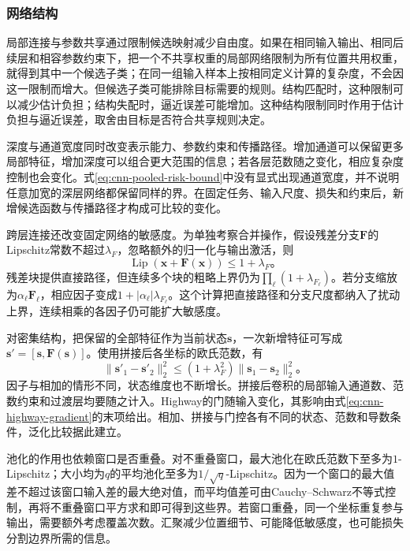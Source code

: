 \subsubsection{网络结构}
\label{sec:cnn-structure-generalization}

局部连接与参数共享通过限制候选映射减少自由度。如果在相同输入输出、相同后续层和相容参数约束下，把一个不共享权重的局部网络限制为所有位置共用权重，就得到其中一个候选子类；在同一组输入样本上按相同定义计算的复杂度，不会因这一限制而增大。但候选子类可能排除目标需要的规则。结构匹配时，这种限制可以减少估计负担；结构失配时，逼近误差可能增加。这种结构限制同时作用于估计负担与逼近误差，取舍由目标是否符合共享规则决定。

深度与通道宽度同时改变表示能力、参数约束和传播路径。增加通道可以保留更多局部特征，增加深度可以组合更大范围的信息；若各层范数随之变化，相应复杂度控制也会变化。式\eqref{eq:cnn-pooled-risk-bound}中没有显式出现通道宽度，并不说明任意加宽的深层网络都保留同样的界。在固定任务、输入尺度、损失和约束后，新增候选函数与传播路径才构成可比较的变化。

跨层连接还改变固定网络的敏感度。为单独考察合并操作，假设残差分支$\bm F$的Lipschitz常数不超过$\lambda_F$，忽略额外的归一化与输出激活，则
\begin{equation}
  \operatorname{Lip}(\bm x+\bm F(\bm x))\leq1+\lambda_F\text{。}
  \label{eq:cnn-residual-lipschitz}
\end{equation}
残差块提供直接路径，但连续多个块的粗略上界仍为$\prod_\ell(1+\lambda_{F_\ell})$。若分支缩放为$\alpha_\ell\bm F_\ell$，相应因子变成$1+|\alpha_\ell|\lambda_{F_\ell}$。这个计算把直接路径和分支尺度都纳入了扰动上界，连续相乘的各因子仍可能扩大敏感度。

对密集结构，把保留的全部特征作为当前状态$\bm s$，一次新增特征可写成$\bm s'=[\bm s,\bm F(\bm s)]$。使用拼接后各坐标的欧氏范数，有
\begin{equation}
  \lVert\bm s'_1-\bm s'_2\rVert_2^2
  \leq(1+\lambda_F^2)\lVert\bm s_1-\bm s_2\rVert_2^2\text{。}
  \label{eq:cnn-dense-lipschitz}
\end{equation}
因子与相加的情形不同，状态维度也不断增长。拼接后卷积的局部输入通道数、范数约束和过渡层均要随之计入。Highway的门随输入变化，其影响由式\eqref{eq:cnn-highway-gradient}的末项给出。相加、拼接与门控各有不同的状态、范数和导数条件，泛化比较据此建立。

池化的作用也依赖窗口是否重叠。对不重叠窗口，最大池化在欧氏范数下至多为$1$-Lipschitz；大小均为$q$的平均池化至多为$1/\sqrt q$-Lipschitz。因为一个窗口的最大值差不超过该窗口输入差的最大绝对值，而平均值差可由Cauchy--Schwarz不等式控制，再将不重叠窗口平方求和即可得到这些界。若窗口重叠，同一个坐标重复参与输出，需要额外考虑覆盖次数。汇聚减少位置细节、可能降低敏感度，也可能损失分割边界所需的信息。

